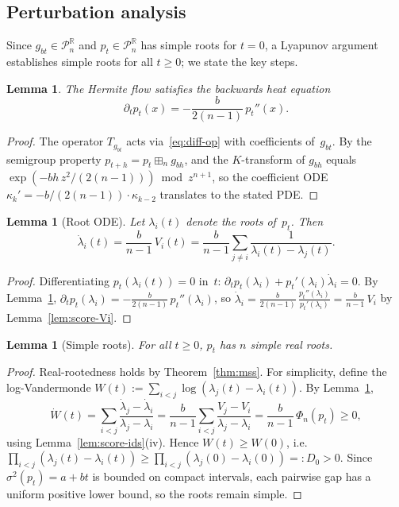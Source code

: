 \documentclass[11pt,a4paper]{amsart}
\theoremstyle{plain}
\newtheorem{lemma}[theorem]{Lemma}
\theoremstyle{definition}
\theoremstyle{remark}
\newcommand{\R}{\mathbb{R}}
\newcommand{\PnR}[1][n]{\mathcal{P}^{\R}_{#1}}
\newcommand{\fp}{\boxplus_n}
\begin{document}
\subsection{Perturbation analysis}

Since $g_{bt}\in\PnR$ and $p_t\in\PnR$ has simple roots for
$t=0$, a Lyapunov argument establishes simple roots for all
$t\ge 0$; we state the key steps.

\begin{lemma}\label{lem:heat}
The Hermite flow satisfies the backwards heat equation
\[
  \partial_t p_t(x)
  =-\frac{b}{2(n-1)}\,p_t''(x).
\]
\end{lemma}

\begin{proof}
The operator $T_{g_{bt}}$ acts via~\eqref{eq:diff-op}
with coefficients of~$g_{bt}$.
By the semigroup property $p_{t+h}=p_t\fp g_{bh}$, and
the $K$-transform of $g_{bh}$ equals
$\exp(-bh\,z^2/(2(n-1)))\bmod z^{n+1}$,
so the coefficient ODE
$\kappa_k'=-b/(2(n-1))\cdot\kappa_{k-2}$
translates to the stated PDE.
\end{proof}

\begin{lemma}[Root ODE]\label{lem:root-ode}
Let $\lambda_i(t)$ denote the roots of~$p_t$.
Then
\begin{equation}\label{eq:root-ode}
  \dot\lambda_i(t)
  =\frac{b}{n-1}\,V_i(t)
  =\frac{b}{n-1}\sum_{j\ne i}
   \frac{1}{\lambda_i(t)-\lambda_j(t)}.
\end{equation}
\end{lemma}

\begin{proof}
Differentiating $p_t(\lambda_i(t))=0$ in~$t$:
$\partial_t p_t(\lambda_i)+p_t'(\lambda_i)\dot\lambda_i=0$.
By Lemma~\ref{lem:heat},
$\partial_t p_t(\lambda_i)
=-\frac{b}{2(n-1)}\,p_t''(\lambda_i)$,
so $\dot\lambda_i
=\frac{b}{2(n-1)}\,
 \frac{p_t''(\lambda_i)}{p_t'(\lambda_i)}
=\frac{b}{n-1}\,V_i$
by Lemma~\ref{lem:score-Vi}.
\end{proof}

\begin{lemma}[Simple roots]\label{lem:simple}
For all $t\ge 0$, $p_t$ has $n$ simple real roots.
\end{lemma}

\begin{proof}
Real-rootedness holds by Theorem~\ref{thm:mss}.
For simplicity, define the log-Vandermonde
$W(t):=\sum_{i<j}\log(\lambda_j(t)-\lambda_i(t))$.
By Lemma~\ref{lem:root-ode},
\[
  \dot W(t)=\sum_{i<j}
  \frac{\dot\lambda_j-\dot\lambda_i}
       {\lambda_j-\lambda_i}
  =\frac{b}{n-1}\sum_{i<j}
  \frac{V_j-V_i}{\lambda_j-\lambda_i}
  =\frac{b}{n-1}\,\Phi_n(p_t)\ge 0,
\]
using Lemma~\ref{lem:score-ids}(iv).
Hence $W(t)\ge W(0)$, i.e.\
$\prod_{i<j}(\lambda_j(t)-\lambda_i(t))
\ge\prod_{i<j}(\lambda_j(0)-\lambda_i(0))=:D_0>0$.
Since $\sigma^2(p_t)=a+bt$ is bounded on compact
intervals, each pairwise gap has a uniform positive
lower bound, so the roots remain simple.
\end{proof}
\end{document}
